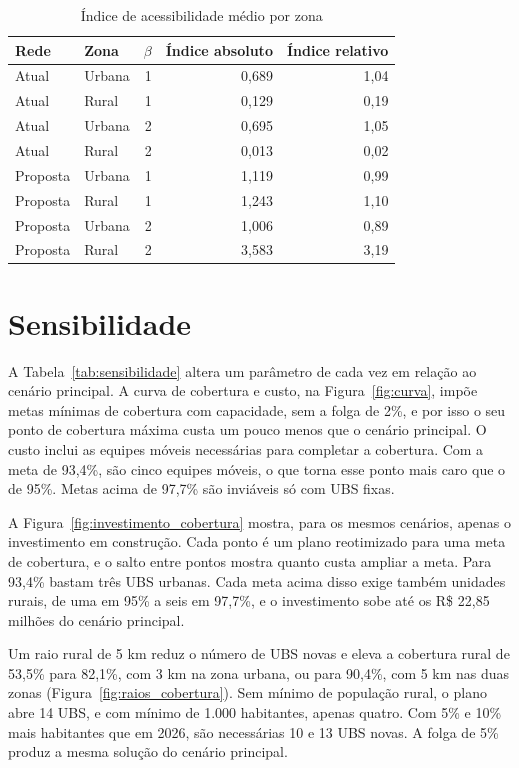 \begin{table}[htbp]\centering
\caption{Índice de acessibilidade médio por zona}\label{tab:acessibilidade}
\begin{tabular}{llrrr}\toprule Rede & Zona & $\beta$ & Índice absoluto & Índice relativo\\\midrule
Atual & Urbana & 1 & 0,689 & 1,04\\
Atual & Rural & 1 & 0,129 & 0,19\\
Atual & Urbana & 2 & 0,695 & 1,05\\
Atual & Rural & 2 & 0,013 & 0,02\\
Proposta & Urbana & 1 & 1,119 & 0,99\\
Proposta & Rural & 1 & 1,243 & 1,10\\
Proposta & Urbana & 2 & 1,006 & 0,89\\
Proposta & Rural & 2 & 3,583 & 3,19\\
\bottomrule\end{tabular}
\end{table}

\section{Sensibilidade}

A Tabela~\ref{tab:sensibilidade} altera um parâmetro de cada vez em relação ao cenário principal. A
curva de cobertura e custo, na Figura~\ref{fig:curva}, impõe metas mínimas de cobertura com capacidade, sem a folga de
2\%, e por isso o seu ponto de cobertura máxima custa um pouco menos que o cenário principal. O
custo inclui as equipes móveis necessárias para completar a cobertura. Com a meta de 93,4\%, são cinco
equipes móveis, o que torna esse ponto mais caro que o de 95\%. Metas acima de 97,7\% são inviáveis só
com UBS fixas.

A Figura~\ref{fig:investimento_cobertura} mostra, para os mesmos cenários, apenas o investimento em
construção. Cada ponto é um plano reotimizado para uma meta de cobertura, e o salto entre pontos mostra
quanto custa ampliar a meta. Para 93,4\% bastam três UBS urbanas. Cada meta acima disso exige
também unidades rurais, de uma em 95\% a seis em 97,7\%, e o investimento sobe até os R\$ 22,85 milhões
do cenário principal.

Um raio rural de 5 km reduz o número de UBS novas e eleva a cobertura rural de 53,5\% para 82,1\%, com
3 km na zona urbana, ou para 90,4\%, com 5 km nas duas zonas (Figura~\ref{fig:raios_cobertura}). Sem
mínimo de população rural, o plano abre 14 UBS, e com mínimo de 1.000 habitantes, apenas quatro. Com 5\%
e 10\% mais habitantes que em 2026, são necessárias 10 e 13 UBS novas. A folga de 5\% produz a mesma
solução do cenário principal.

